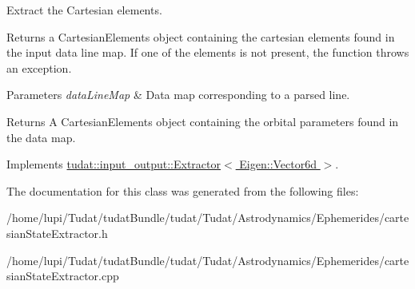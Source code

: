 Extract the Cartesian elements. 

Returns a Cartesian\+Elements object containing the cartesian elements found in the input data line map. If one of the elements is not present, the function throws an exception.


\begin{DoxyParams}{Parameters}
{\em data\+Line\+Map} & Data map corresponding to a parsed line. \\
\hline
\end{DoxyParams}
\begin{DoxyReturn}{Returns}
A Cartesian\+Elements object containing the orbital parameters found in the data map. 
\end{DoxyReturn}


Implements \hyperlink{classtudat_1_1input__output_1_1Extractor_a702e1c0f4ffc78cad05c1005e3755e94}{tudat\+::input\+\_\+output\+::\+Extractor$<$ Eigen\+::\+Vector6d $>$}.



The documentation for this class was generated from the following files\+:\begin{DoxyCompactItemize}
\item 
/home/lupi/\+Tudat/tudat\+Bundle/tudat/\+Tudat/\+Astrodynamics/\+Ephemerides/cartesian\+State\+Extractor.\+h\item 
/home/lupi/\+Tudat/tudat\+Bundle/tudat/\+Tudat/\+Astrodynamics/\+Ephemerides/cartesian\+State\+Extractor.\+cpp\end{DoxyCompactItemize}
